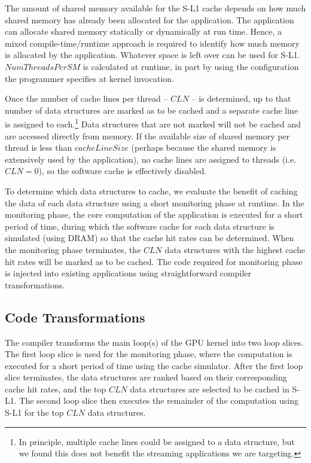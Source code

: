 The amount of shared memory available for the S-L1 cache depends on how much shared memory has already been allocated for the application.
The application can allocate shared memory statically or dynamically at run time.
Hence,  a mixed compile-time/runtime approach is required to identify how much memory is allocated by the application.
Whatever space is left over can be used for S-L1.
$NumThreadsPerSM$ is calculated at runtime, in part  by using the configuration the programmer specifies at kernel invocation. 

Once the number of cache lines per thread -- $CLN$ -- is determined, up to that number
of data structures are marked as to be cached and a separate cache line is assigned to each.\footnote{
	In principle, multiple cache lines could be assigned to a data structure, 
	but we found this does not benefit  the streaming applications we are targeting.}
Data structures that are not marked will not be cached and are accessed directly from memory. 
If the available size of shared memory per thread is less than $cacheLineSize$ (perhaps because the shared memory is extensively used by the application), no cache lines are assigned to threads (i.e. $CLN = 0$), so the software cache is effectively disabled. 

To determine which data structures to cache, we evaluate the benefit of caching the data of each data structure using a short monitoring phase at runtime.
In the monitoring phase, the core computation of the application is executed for a short period of time, during which the software cache for each data structure is simulated (using DRAM) so that the cache hit rates can be determined.
When the monitoring phase terminates, the $CLN$ data structures with the highest cache hit rates will be marked as to be cached. 
The code required for monitoring phase is injected into existing applications using straightforward compiler transformations. 



\subsection{Code Transformations}
The compiler transforms the main loop(s) of the GPU kernel into two loop slices. 
The first loop slice is used for the monitoring phase, where the computation is executed for a short period of time using the cache simulator.
After the first loop slice terminates, the data structures are ranked based on their corresponding cache hit rates, and the top $CLN$ data structures are selected to be cached in S-L1. 
The second loop slice then executes the remainder of the computation using S-L1 for the top $CLN$  data structures.

